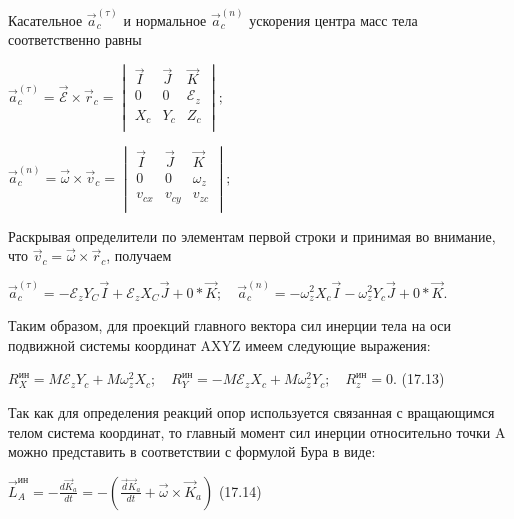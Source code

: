 {\begin{center}
    \par Касательное $\vec{a}_c^{(\tau)}$ и нормальное  $\vec{a}_c^{(n)}$ ускорения центра масс тела соответственно равны
    
    \par $\vec{a}_c^{(\tau)} = \vec{\mathcal{E}} \times \vec{r}_c = 
    \begin{vmatrix}
      \vec{I}& \vec{J}& \vec{K}\\
      0& 0& \mathcal{E}_z\\
      X_c& Y_c& Z_c\\
    \end{vmatrix};$
    
    \quad 
    
    $\vec{a}_c^{(n)} = \vec{\omega} \times \vec{v}_c = 
    \begin{vmatrix}
      \vec{I}& \vec{J}& \vec{K}\\
      0& 0& \omega_z\\
      v_{cx}& v_{cy}& v_{zc}\\
    \end{vmatrix};$
    
    \par Раскрывая определители по элементам первой строки и принимая во внимание, что $\vec{v}_c = \vec{\omega} \times \vec{r}_c $, получаем
    
    \par  $\vec{a}_c^{(\tau)} = -\mathcal{E}_z{Y}_C\vec{I} + \mathcal{E}_z{X}_C\vec{J} + 0*\vec{K}; \quad \vec{a}_c^{(n)} = -\omega_z^2X_c\vec{I} - \omega_z^2Y_c\vec{J} + 0*\vec{K}.$
    
    \par Таким образом, для проекций главного вектора сил инерции тела на оси подвижной системы координат AXYZ имеем следующие выражения:
    \par
    $R_X^{\text{ин}}=M\mathcal{E}_zY_c + M\omega_z^2X_c; \quad R_Y^{\text{ин}}=-M\mathcal{E}_zX_c + M\omega_z^2Y_c ; \quad R_z^{\text{ин}}=0.$ \quad (17.13)
    
    \par Так как для определения реакций опор используется связанная с вращающимся телом система координат, то главный момент сил инерции относительно точки A можно представить в соответствии с формулой Бура в виде:
    \par               
    \par 
    $\Vec{L}_A^{\text{ин}} = -\frac{d\vec{K}_a}{dt}=-(\frac{\Vec{d}\vec{K}_a}{dt} + \Vec{\omega}\times \vec{K}_a)$ \qquad (17.14)
    

\end{center}}
